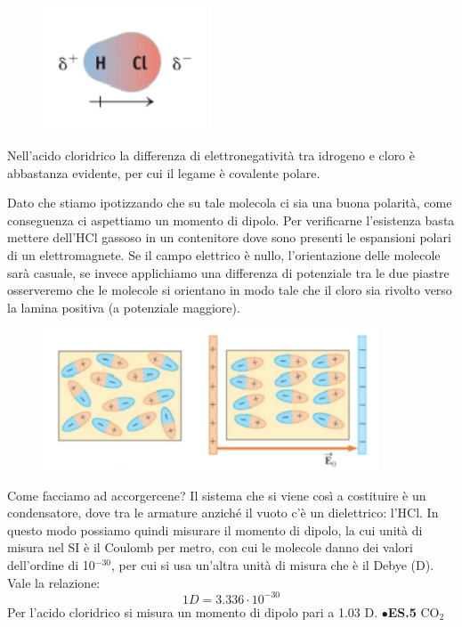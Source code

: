 \vspace{-0.4cm}\begin{figure}[htp]
    \centering
    \includegraphics[width=5cm]{immagini/HCl.png}
\end{figure}

\vspace{-0.4cm}Nell'acido cloridrico la differenza di elettronegatività tra idrogeno e cloro è abbastanza evidente, per cui il legame è covalente polare.

Dato che stiamo ipotizzando che su tale molecola ci sia una buona polarità, come conseguenza ci aspettiamo un momento di dipolo.
Per verificarne l'esistenza basta mettere dell'HCl gassoso in un contenitore dove sono presenti le espansioni polari di un elettromagnete. Se il campo elettrico è nullo, l'orientazione delle molecole sarà casuale, se invece applichiamo una differenza di potenziale tra le due piastre osserveremo che le molecole si orientano in modo tale che il cloro sia rivolto verso la lamina positiva (a potenziale maggiore).
\begin{figure}[htp]
    \centering
    \includegraphics[width=10cm]{immagini/condensatore.png}
\end{figure}
Come facciamo ad accorgercene?
Il sistema che si viene così a costituire è un condensatore, dove tra le armature anziché il vuoto c'è un dielettrico: l'HCl. In questo modo possiamo quindi misurare il momento di dipolo, la cui unità di misura nel SI è il Coulomb per metro, con cui le molecole danno dei valori dell'ordine di 10$^{-30}$, per cui si usa un'altra unità di misura che è il Debye (D). Vale la relazione:
$$1D=3.336\cdot10^{-30}$$
Per l'acido cloridrico si misura un momento di dipolo pari a 1.03 D.
\newpage
\vspace{0.2cm}$\bullet$\textbf{ES.5} CO$_2$

